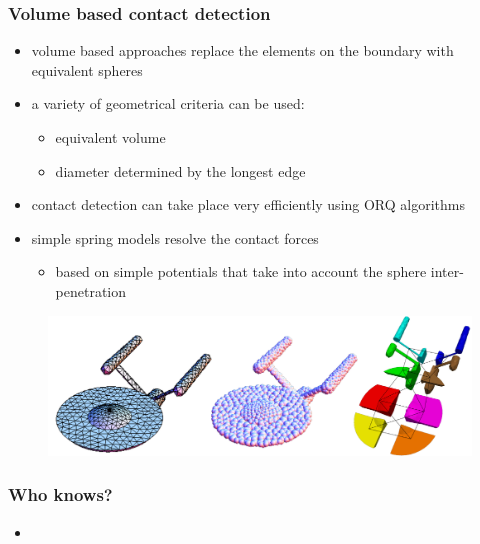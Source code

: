 \begin{frame}[fragile]
%
  \frametitle{Volume based contact detection}
%
  \begin{itemize}
%
  \item volume based approaches replace the elements on the boundary with equivalent spheres
  \item a variety of geometrical criteria can be used: 
    \begin{itemize}
      \item equivalent volume
      \item diameter determined by the longest edge
    \end{itemize}
% 
  \item contact detection can take place very efficiently using ORQ algorithms
  \item simple spring models resolve the contact forces
    \begin{itemize}
    \item based on simple potentials that take into account the sphere inter-penetration
    \end{itemize}
%
  \end{itemize}
%
  \begin{figure}
    \includegraphics[scale=0.5]{figures/mesh-volumecontact.pdf}
  \end{figure}
%
\end{frame}

\begin{frame}[fragile]
%
  \frametitle{Who knows?}
%
  \begin{itemize}
%
  \item
%
  \end{itemize}
%
\end{frame}



